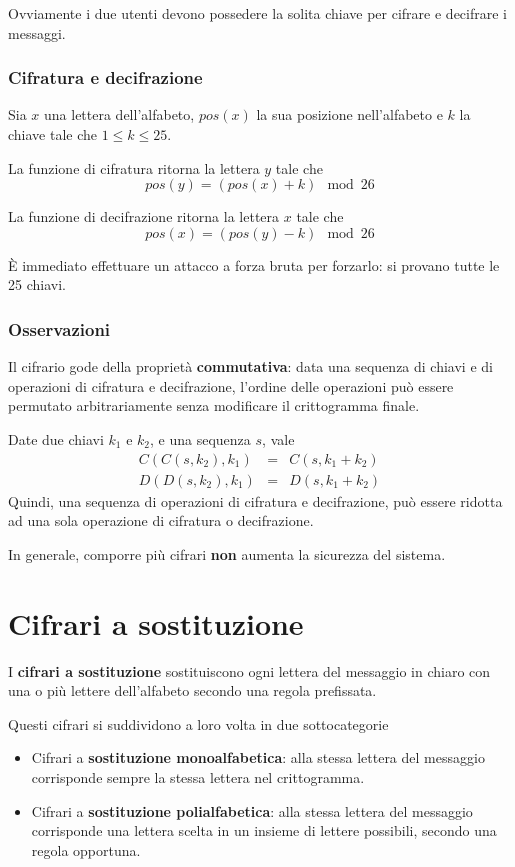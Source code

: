 Ovviamente i due utenti devono possedere la solita chiave per cifrare e decifrare i messaggi.

\subsubsection{Cifratura e decifrazione}
Sia $x$ una lettera dell'alfabeto, $pos(x)$ la sua posizione nell'alfabeto e $k$ la chiave tale che $1 \leq k \leq 25$.

La funzione di cifratura ritorna la lettera $y$ tale che
\[ pos(y) = (pos(x) + k) \mod{26} \]

La funzione di decifrazione ritorna la lettera $x$ tale che
\[ pos(x) = (pos(y) - k) \mod{26} \]

\`E immediato effettuare un attacco a forza bruta per forzarlo: si provano tutte le 25 chiavi.

\subsubsection{Osservazioni}
Il cifrario gode della propriet\`a \textbf{commutativa}: data una sequenza di chiavi e di operazioni di cifratura e
decifrazione, l'ordine delle operazioni pu\`o essere permutato arbitrariamente senza modificare il crittogramma finale.

Date due chiavi $k_1$ e $k_2$, e una sequenza $s$, vale
\[
	\begin{matrix}
		C(C(s, k_2), k_1) & = & C(s, k_1 + k_2) \\
		D(D(s, k_2), k_1) & = & D(s, k_1 + k_2)
	\end{matrix}
\]
Quindi, una sequenza di operazioni di cifratura e decifrazione, pu\`o essere ridotta ad una sola operazione di cifratura
o decifrazione.

In generale, comporre pi\`u cifrari \textbf{non} aumenta la sicurezza del sistema.

\section{Cifrari a sostituzione}\label{sostituzione}
I \textbf{cifrari a sostituzione} sostituiscono ogni lettera del messaggio in chiaro con una o pi\`u lettere
dell'alfabeto secondo una regola prefissata.

Questi cifrari si suddividono a loro volta in due sottocategorie
\begin{itemize}
	\item Cifrari a \textbf{sostituzione monoalfabetica}: alla stessa lettera del messaggio corrisponde sempre la
	      stessa lettera nel crittogramma.
	\item Cifrari a \textbf{sostituzione polialfabetica}: alla stessa lettera del messaggio corrisponde una lettera
	      scelta in un insieme di lettere possibili, secondo una regola opportuna.
\end{itemize}

